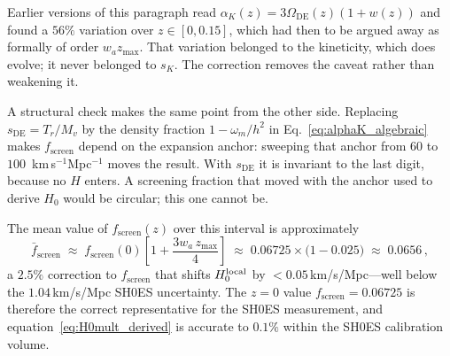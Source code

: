 \documentclass[12pt,a4paper]{article}
\newcommand{\Omde}{\Omega_{\mathrm{DE}}}  %
\newcommand{\fsc}{f_{\mathrm{screen}}}
\newcommand{\sK}{s_K}          %
\newcommand{\sDE}{s_{\mathrm{DE}}} %
\newcommand{\alphaK}{\alpha_K}     %
\renewcommand{\Omega}{\varOmega}
\begin{document}
Earlier versions of this paragraph read $\alphaK(z) = 3\Omde(z)(1+w(z))$ and
found a $56\%$ variation over $z\in[0,0.15]$, which had then to be argued away
as formally of order $w_a z_{\max}$.  That variation belonged to the
kineticity, which does evolve; it never belonged to $\sK$.  The correction
removes the caveat rather than weakening it.

A structural check makes the same point from the other side.  Replacing $\sDE
= T_r/M_v$ by the density fraction $1-\omega_m/h^2$ in
Eq.~\eqref{eq:alphaK_algebraic} makes $\fsc$ depend on the expansion anchor:
sweeping that anchor from $60$ to $100$~km\,s$^{-1}$Mpc$^{-1}$ moves the
result.  With $\sDE$ it is invariant to the last digit, because no $H$ enters.
A screening fraction that moved with the anchor used to derive $H_0$ would be
circular; this one cannot be.

The mean value of $\fsc(z)$ over this interval is approximately
\begin{equation}
  \bar\fsc \;\approx\; \fsc(0)\left[1 + \frac{3w_a\,z_{\max}}{4}\right]
            \;\approx\; 0.06725\times\bigl(1 - 0.025\bigr)
            \;\approx\; 0.0656\,,
\end{equation}
a $2.5\%$ correction to $\fsc$ that shifts $H_0^{\rm local}$ by
$< 0.05$\,km/s/Mpc---well below the $1.04$\,km/s/Mpc SH0ES uncertainty.
The $z=0$ value $\fsc = 0.06725$ is therefore the correct representative
for the SH0ES measurement, and equation~\eqref{eq:H0mult_derived} is
accurate to $0.1\%$ within the SH0ES calibration volume.
\end{document}
